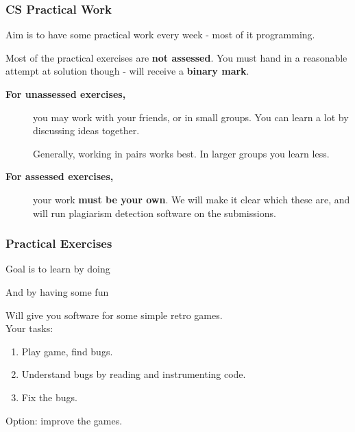 \documentclass{beamer} %
\newcommand\emc[1]{\textcolor{midred}{\textbf{#1}}}
\begin{document}
\begin{frame}
  \frametitle{CS Practical Work}

  Aim is to have some practical work every week - most of it programming.

\vspace{3mm}
  Most of the practical exercises are \emc{not assessed}.  You must hand in
  a reasonable attempt at solution though - will receive a \emc{binary
  mark}.

 \begin{description}
  \item[{\bf For unassessed exercises,}] you may work with your friends, or in
  small groups.  You can learn a lot by discussing ideas together.

  \vspace{3mm}
Generally, working in pairs works best.  In larger groups you learn
  less.

  \item[{\bf For assessed exercises,}] your work \emc{\bf must be your own}.  We will make
  it clear which these are, and will run plagiarism detection software
  on the submissions.
  \end{description}
\end{frame}

\begin{frame}
  \frametitle{Practical Exercises}

  Goal is to learn by doing

  \vspace{2mm}
  And by having some fun

  \vspace{2mm}
  Will give you software for some simple retro games.\\
  Your tasks:
  \begin{enumerate}
  \item Play game, find bugs.
  \item Understand bugs by reading and instrumenting code.
  \item Fix the bugs.
  \end{enumerate}
  Option: improve the games.
\end{frame}
\end{document}
